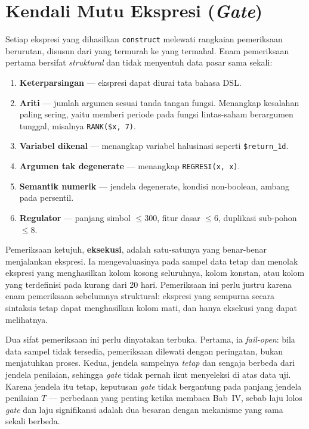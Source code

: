 \documentclass{laporanta1statugm}
\newcommand{\code}[1]{\texttt{#1}}
\begin{document}
\section{Kendali Mutu Ekspresi (\textit{Gate})}

Setiap ekspresi yang dihasilkan \code{construct} melewati rangkaian pemeriksaan
berurutan, disusun dari yang termurah ke yang termahal. Enam pemeriksaan
pertama bersifat \emph{struktural} dan tidak menyentuh data pasar sama sekali:

\begin{enumerate}
  \item \textbf{Keterparsingan} --- ekspresi dapat diurai tata bahasa DSL.
  \item \textbf{Ariti} --- jumlah argumen sesuai tanda tangan fungsi. Menangkap
        kesalahan paling sering, yaitu memberi periode pada fungsi
        lintas-saham berargumen tunggal, misalnya \code{RANK(\$x, 7)}.
  \item \textbf{Variabel dikenal} --- menangkap variabel halusinasi seperti
        \code{\$return\_1d}.
  \item \textbf{Argumen tak degenerate} --- menangkap \code{REGRESI(x, x)}.
  \item \textbf{Semantik numerik} --- jendela degenerate, kondisi non-boolean,
        ambang pada persentil.
  \item \textbf{Regulator} --- panjang simbol $\le 300$, fitur dasar $\le 6$,
        duplikasi sub-pohon $\le 8$.
\end{enumerate}

Pemeriksaan ketujuh, \textbf{eksekusi}, adalah satu-satunya yang benar-benar
menjalankan ekspresi. Ia mengevaluasinya pada sampel data tetap dan menolak
ekspresi yang menghasilkan kolom kosong seluruhnya, kolom konstan, atau kolom
yang terdefinisi pada kurang dari 20 hari. Pemeriksaan ini perlu justru karena
enam pemeriksaan sebelumnya struktural: ekspresi yang sempurna secara sintaksis
tetap dapat menghasilkan kolom mati, dan hanya eksekusi yang dapat melihatnya.

Dua sifat pemeriksaan ini perlu dinyatakan terbuka. Pertama, ia
\emph{fail-open}: bila data sampel tidak tersedia, pemeriksaan dilewati dengan
peringatan, bukan menjatuhkan proses. Kedua, jendela sampelnya \emph{tetap} dan
sengaja berbeda dari jendela penilaian, sehingga \textit{gate} tidak pernah
ikut menyeleksi di atas data uji. Karena jendela itu tetap, keputusan
\textit{gate} tidak bergantung pada panjang jendela penilaian $T$ --- perbedaan
yang penting ketika membaca Bab~IV, sebab laju lolos \textit{gate} dan laju
signifikansi adalah dua besaran dengan mekanisme yang sama sekali berbeda.
\end{document}
